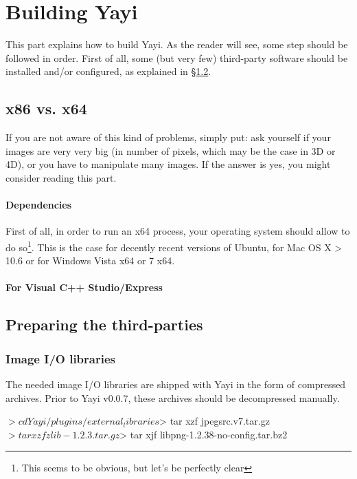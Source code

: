 \chapter{Building Yayi}
This part explains how to build Yayi. As the reader will see, some step should be followed in order. First of all, some (but very few) third-party software should be installed and/or configured, as explained in \S \ref{sec:preparing_thirdparties}. 

\section{x86 vs. x64}
\label{sec:x86x64}
If you are not aware of this kind of problems, simply put: ask yourself if your images are very very big (in number of pixels, which may be the case in 3D or 4D), or you have to manipulate many images. If the answer is yes, you might consider reading this part. 

\subsubsection{Dependencies}
First of all, in order to run an x64 process, your operating system should allow to do so\footnote{This seems to be obvious, but let's be perfectly clear}. This is the case for decently recent versions of Ubuntu, for Mac OS X > 10.6 or for Windows Vista x64 or 7 x64.

\subsubsection{For Visual C++ Studio/Express}
\label{sec:build_yayi_express}






\section{Preparing the third-parties}
\label{sec:preparing_thirdparties}

 

\subsection{Image I/O libraries}
The needed image I/O libraries are shipped with Yayi in the form of compressed archives. Prior to Yayi v0.0.7, these archives should be decompressed manually.
\begin{bash}
$> cd Yayi/plugins/external_libraries
$> tar xzf jpegsrc.v7.tar.gz
$> tar xzf zlib-1.2.3.tar.gz
$> tar xjf libpng-1.2.38-no-config.tar.bz2
\end{bash}


